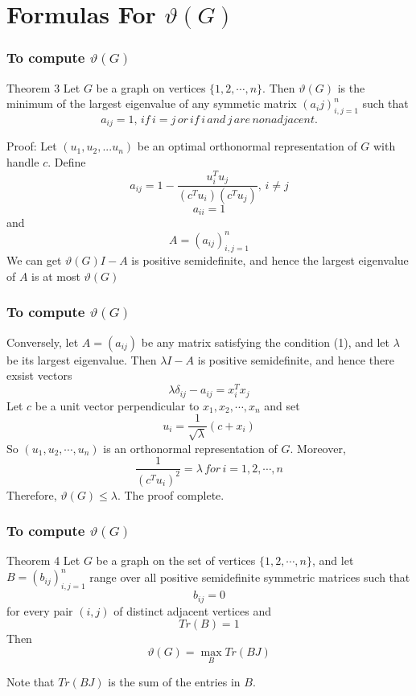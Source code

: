 \documentclass{beamer}
\begin{document}
\section{Formulas For $\vartheta (G)$}


\begin{frame}
\frametitle{To compute $\vartheta (G)$}

\begin{block}{Theorem 3}
Let $G$ be a graph on vertices $\{1,2,\cdots ,n\}$. Then $\vartheta (G)$ is the minimum of the largest eigenvalue of any symmetic matrix $(a_ij)^{n}_{i,j=1}$ such that 
\begin{equation}
a_{ij}=1,\,if\, i=j\, or\, if\, i\, and\, j\, are\, nonadjacent.
\end{equation}
\end{block}

Proof: 
Let $(u_1,u_2,...u_n)$ be an optimal orthonormal representation of $G$ with handle $c$. Define
\[
a_{ij}=1-\frac{u_i^T u_j}{(c^T u_i) (c^T u_j)},\, i\neq j
\]
\[
a_{ii}=1
\]
and 
\[
A=(a_{ij})_{i,j=1}^{n}
\]
We can get $\vartheta (G) I-A$ is positive semidefinite, and hence the largest eigenvalue of $A$ is at most $\vartheta (G)$

\end{frame}

\begin{frame}
\frametitle{To compute $\vartheta (G)$}
Conversely, let $A=(a_{ij})$ be any matrix satisfying the condition (1), and let $\lambda$ be its largest eigenvalue. Then $\lambda I-A$ is positive semidefinite, and hence there exsist vectors
\[
\lambda\delta_{ij}-a_{ij}=x_i^T x_j
\]
Let $c$ be a unit vector perpendicular to $x_1, x_2, \cdots, x_n$ and set 
\[
u_i=\frac{1}{\sqrt{\lambda}} (c+x_i)
\]
So $(u_1,u_2,\cdots,u_n)$ is an orthonormal representation of $G$. Moreover, 
\[
\frac{1}{(c^T u_i)^2}=\lambda \, for\, i=1,2,\cdots,n
\]
Therefore, $\vartheta (G)\leq \lambda$. The proof complete.

\end{frame}

\begin{frame}
\frametitle{To compute $\vartheta (G)$}

\begin{block}{Theorem 4}
Let $G$ be a graph on the set of vertices $\{1,2,\cdots ,n\}$, and let $B=(b_{ij})^{n}_{i,j=1}$ range over all positive semidefinite symmetric matrices such that 
\begin{equation}
b_{ij}=0
\end{equation}
for every pair $(i,j)$ of distinct adjacent vertices and 
\begin{equation}
Tr(B)=1
\end{equation}
Then 
\[ 
\vartheta (G) = \max_{B} Tr (BJ)
\]

Note that $Tr (BJ)$ is the sum of the entries in $B$.
\end{block}

\end{frame}
\end{document}
